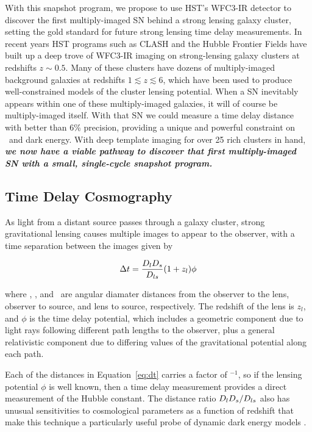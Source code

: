 
With this snapshot program, we propose to use HST's WFC3-IR detector
to discover the first multiply-imaged SN behind a strong lensing
galaxy cluster, setting the gold standard for future strong lensing
time delay measurements.  In recent years HST programs such as CLASH
and the Hubble Frontier Fields have built up a deep trove of WFC3-IR
imaging on strong-lensing galaxy clusters at redshifts $z\sim0.5$.
Many of these clusters have dozens of multiply-imaged background
galaxies at redshifts $1\lesssim z \lesssim 6$, which have been used
to produce well-constrained models of the cluster lensing potential.
When a SN inevitably appears within one of these multiply-imaged
galaxies, it will of course be multiply-imaged itself.  With that SN
we could measure a time delay distance with better than 6\%
precision, providing a unique and powerful
constraint on \Ho\ and dark energy.  With deep template imaging for
over 25 rich clusters in hand, {\bf \it we now have a viable pathway
to discover that first multiply-imaged SN with a small, single-cycle
snapshot program.}


\subsection{Time Delay Cosmography}

As light from a distant source passes through a galaxy cluster,
strong gravitational lensing causes multiple images to appear to the
observer, with a time separation between the images given by

\begin{equation}\label{eq:dt}
  \Delta t = \frac{D_l D_s}{D_{ls}} ( 1 + z_l ) \phi
\end{equation}

\noindent where \Dl, \Ds, and \Dls\ are angular diamater distances from 
the observer to the lens, observer to source, and lens to source,
respectively. The redshift of the lens is $z_l$, and $\phi$ is the
time delay potential, which includes a geometric component due to
light rays following different path lengths to the observer, plus a
general relativistic component due to differing values of the
gravitational potential along each path.

Each of the distances in Equation~\ref{eq:dt} carries a factor
of \Ho$^{-1}$, so if the lensing potential $\phi$ is well known, then a
time delay measurement provides a direct measurement of the Hubble
constant.  The distance ratio $D_lD_s/D_{ls}$ also has
unusual sensitivities to cosmological parameters as a function of
redshift that make this technique a particularly useful probe of
dynamic dark energy models \citep{Linder:2011}.

